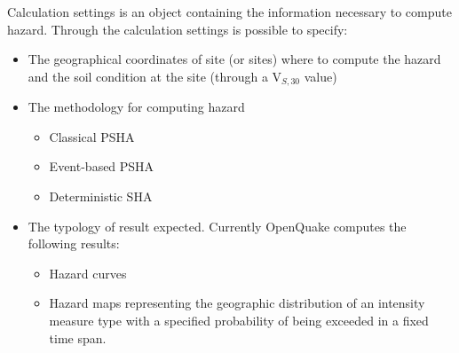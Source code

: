 Calculation settings is an object containing the information necessary 
to compute hazard. Through the calculation settings is possible to 
specify:
\begin{itemize}
\item The geographical coordinates of site (or sites) where to compute the 
hazard and the soil condition at the site (through a V$_{S,30}$ value)
\item The methodology for computing hazard 
	\begin{itemize}
	\item Classical PSHA
	\item Event-based PSHA
	\item Deterministic SHA
	\end{itemize}
\item The typology of result expected. Currently OpenQuake computes the 
following results: 
	\begin{itemize}
	\item Hazard curves
	\item Hazard maps representing the geographic distribution of an intensity 
	measure type with a specified probability of being exceeded in a fixed 
	time span.
	\end{itemize}
\end{itemize}
